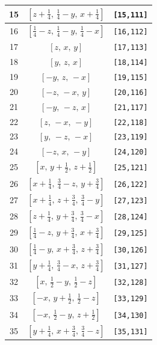 \documentclass[fleqn,8pt]{jsarticle}
\begin{document}
\begin{longtable}{ccc}
15 & $\left[ z + \frac{1}{4},\, \frac{1}{4} - y,\, x + \frac{1}{4} \right]$ & {\tt [15,111]} \\ \hline
16 & $\left[ \frac{1}{4} - z,\, \frac{1}{4} - y,\, \frac{1}{4} - x \right]$ & {\tt [16,112]} \\ \hline
17 & $\left[ z,\, x,\, y \right]$ & {\tt [17,113]} \\ \hline
18 & $\left[ y,\, z,\, x \right]$ & {\tt [18,114]} \\ \hline
19 & $\left[ - y,\, z,\, - x \right]$ & {\tt [19,115]} \\ \hline
20 & $\left[ - z,\, - x,\, y \right]$ & {\tt [20,116]} \\ \hline
21 & $\left[ - y,\, - z,\, x \right]$ & {\tt [21,117]} \\ \hline
22 & $\left[ z,\, - x,\, - y \right]$ & {\tt [22,118]} \\ \hline
23 & $\left[ y,\, - z,\, - x \right]$ & {\tt [23,119]} \\ \hline
24 & $\left[ - z,\, x,\, - y \right]$ & {\tt [24,120]} \\ \hline
25 & $\left[ x,\, y + \frac{1}{2},\, z + \frac{1}{2} \right]$ & {\tt [25,121]} \\ \hline
26 & $\left[ x + \frac{1}{4},\, \frac{3}{4} - z,\, y + \frac{3}{4} \right]$ & {\tt [26,122]} \\ \hline
27 & $\left[ x + \frac{1}{4},\, z + \frac{3}{4},\, \frac{3}{4} - y \right]$ & {\tt [27,123]} \\ \hline
28 & $\left[ z + \frac{1}{4},\, y + \frac{3}{4},\, \frac{3}{4} - x \right]$ & {\tt [28,124]} \\ \hline
29 & $\left[ \frac{1}{4} - z,\, y + \frac{3}{4},\, x + \frac{3}{4} \right]$ & {\tt [29,125]} \\ \hline
30 & $\left[ \frac{1}{4} - y,\, x + \frac{3}{4},\, z + \frac{3}{4} \right]$ & {\tt [30,126]} \\ \hline
31 & $\left[ y + \frac{1}{4},\, \frac{3}{4} - x,\, z + \frac{3}{4} \right]$ & {\tt [31,127]} \\ \hline
32 & $\left[ x,\, \frac{1}{2} - y,\, \frac{1}{2} - z \right]$ & {\tt [32,128]} \\ \hline
33 & $\left[ - x,\, y + \frac{1}{2},\, \frac{1}{2} - z \right]$ & {\tt [33,129]} \\ \hline
34 & $\left[ - x,\, \frac{1}{2} - y,\, z + \frac{1}{2} \right]$ & {\tt [34,130]} \\ \hline
35 & $\left[ y + \frac{1}{4},\, x + \frac{3}{4},\, \frac{3}{4} - z \right]$ & {\tt [35,131]} \\ \hline

\end{longtable}
\end{document}
